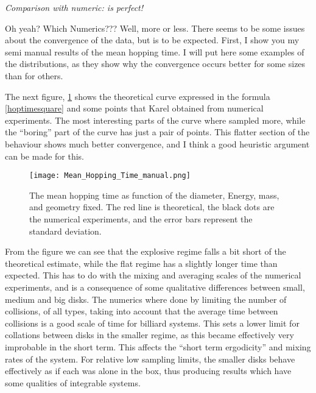 \documentclass[a4paper,10pt]{article}
\begin{document}
\emph{Comparison with numeric: is perfect!}

Oh yeah? Which Numerics???
Well, more or less. There seems to be some issues about the convergence of the
data, but is to be expected. First, I show you my semi manual results of
the mean hopping time. I will put here some examples of the
distributions, as they show why the convergence occurs better for some
sizes than for others.

The next figure, \ref{MeanHopp01} shows the theoretical curve 
expressed in the formula \ref{hoptimesquare} and some points
that Karel obtained from numerical experiments. The most interesting
parts of the curve where sampled more, while the ``boring'' part
of the curve has just a pair of points. This flatter section of
the behaviour shows much better convergence, and I think a
good heuristic argument can be made for this.

\begin{figure}[h]
  \centering
  \texttt{[image: Mean\_Hopping\_Time\_manual.png]}
  \caption{The mean hopping time as function of the diameter, Energy, mass, and geometry fixed.
The red line is theoretical, the black dots are the numerical experiments, and the error bars
represent the standard deviation.}\label{MeanHopp01}
\end{figure}

From the figure we can see that the explosive regime falls a bit short of
the theoretical estimate, while  the flat regime has a slightly longer
time than expected. This has to do with the mixing and averaging scales
of the numerical experiments, and is a consequence of some
qualitative differences between small, medium and big disks. The numerics where done
by limiting the number of collisions, of all types, taking into account
that the average time between collisions is a good scale of time
for billiard systems. This sets a lower limit for collations between
disks in the smaller regime, as this became effectively very
improbable in the short term. This affects the ``short term ergodicity'' and
mixing rates of the system. For relative low sampling limits, the
smaller disks behave effectively as if each was alone in the box, thus
producing results which have some qualities of integrable systems. 
\end{document}
